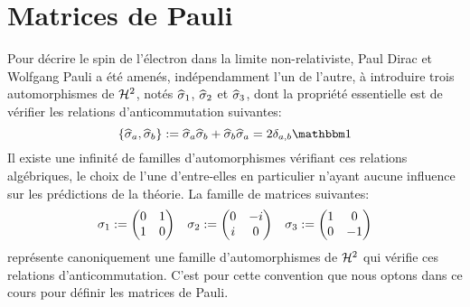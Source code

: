 \section{Matrices de Pauli}

Pour décrire le spin de l'électron dans la limite non-relativiste,
Paul Dirac et Wolfgang Pauli a été amenés, indépendamment l'un de l'autre, à introduire trois automorphismes de $\mathcal H^2$,
notés $\widehat{\sigma}_{1}$, $\widehat{\sigma}_{2}$ et $\widehat{\sigma}_{3}$,
dont la propriété essentielle est de vérifier les relations d'anticommutation suivantes:
\begin{equation*}
\left\{ \sigop a, \sigop b \right\} \eqdef \sigop a \sigop b + \sigop b \sigop a = 2 \delta_{a,b} \Id
\end{equation*}
Il existe une infinité de familles d'automorphismes vérifiant ces relations algébriques,
le choix de l'une d'entre-elles en particulier n'ayant aucune influence sur les prédictions de la théorie.
La famille de matrices suivantes:
$$
\begin{array}{ccc}
\sigma_{1} := \left(\begin{matrix} 0 & 1 \\ 1 & 0 \end{matrix}\right) &
\sigma_{2} := \left(\begin{matrix} 0 & -i \\ i & 0\end{matrix}\right) &
\sigma_{3} := \left(\begin{matrix} 1 & 0 \\ 0 & -1\end{matrix}\right)
\end{array}
$$
représente canoniquement une famille d'automorphismes de $\mathcal H^2$ qui vérifie ces relations d'anticommutation.
C'est pour cette convention que nous optons dans ce cours pour définir les matrices de Pauli.
